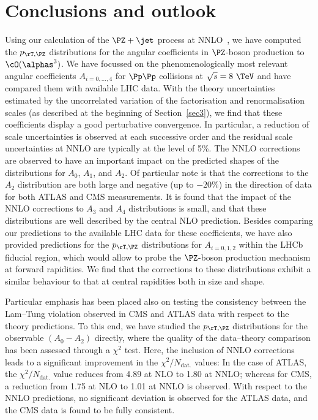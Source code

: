 
\section{Conclusions and outlook} 
\label{sec:4}

Using our calculation of the $\PZ+\jet$ process at NNLO~\cite{Ridder:2015dxa}, we have computed the $\ptz$ distributions 
for the angular coefficients in $\PZ$-boson production to $\cO(\alphas^3)$.
%
We have focussed on the phenomenologically most relevant angular coefficients $A_{i=0,\ldots,4}$ for 
$\Pp\Pp$ collisions at $\sqrt{s} = 8~\TeV$ and have compared them with available LHC data.
%
With the theory uncertainties estimated by the uncorrelated variation of the factorisation and renormalisation scales (as described at the beginning of Section~\ref{sec3}), we find that these coefficients display a good perturbative convergence. In particular, a reduction of scale uncertainties is observed at each successive order and the residual scale uncertainties at NNLO are typically at the level of 5\%.
%
The NNLO corrections are observed to have an important impact on the predicted shapes of the distributions for $A_0$, $A_1$, and $A_2$. Of particular note is that the corrections to the $A_2$ distribution are both large and negative (up to $-20\%$) in the direction of data for both ATLAS and CMS measurements. 
%
It is found that the impact of the NNLO corrections to $A_3$ and $A_4$ distributions is small, and that these distributions are well described by the central NLO prediction.
%
Besides comparing our predictions to the available LHC data for these coefficients, we have also provided predictions for the $\ptz$ distributions for $A_{i=0,1,2}$ within the LHCb fiducial region, which would allow to probe the $\PZ$-boson production mechanism at forward rapidities. 
We find that the corrections to these distributions exhibit a similar behaviour to that at central rapidities both in size and shape.

Particular emphasis has been placed also on testing the consistency between the Lam--Tung violation 
observed in CMS and ATLAS data with respect to the theory predictions. 
To this end, we have studied the $\ptz$ distributions for the observable $(A_0-A_2)$ directly, where
the quality of the data--theory comparison has been assessed through a $\chi^2$ test.
%
Here, the inclusion of NNLO corrections leads to a significant improvement in the $\chi^2/N_\mathrm{dat.}$ values:
In the case of ATLAS, the $\chi^2/N_\mathrm{dat.}$ value reduces from 4.89 at NLO to 1.80 at NNLO; whereas for CMS, 
a reduction from 1.75 at NLO to 1.01 at NNLO is observed. With respect to the NNLO predictions,
no significant deviation is observed for the ATLAS data, and the CMS data is found to be fully consistent.

